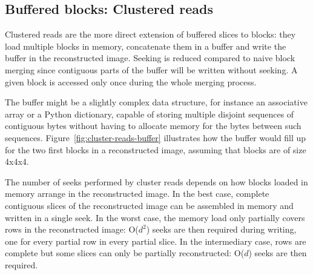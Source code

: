 \documentclass[10pt, conference, compsocconf]{IEEEtran}
\begin{document}
\subsection{Buffered blocks: Clustered reads}

Clustered reads are the more direct extension of buffered slices to
blocks: they load multiple blocks in memory, concatenate them in a
buffer and write the buffer in the reconstructed image. Seeking is
reduced compared to naive block merging since contiguous parts of the
buffer will be written without seeking. A given
block is accessed only once during the whole merging process.

The buffer might be a slightly complex data structure, for instance an
associative array or a Python dictionary, capable of storing multiple
disjoint sequences of contiguous bytes without having to allocate
memory for the bytes between such
sequences. Figure~\ref{fig:cluster-reads-buffer} illustrates how the
buffer would fill up for the two first blocks in a reconstructed
image, assuming that blocks are of size 4x4x4.

The number of seeks performed by cluster reads depends on how blocks
loaded in memory arrange in the reconstructed image. In the best case,
complete contiguous slices of the reconstructed image can be assembled
in memory and written in a single seek. In the worst case, the
memory load only partially covers rows in the reconstructed image:
O($d^2$) seeks are then required during writing, one for every partial
row in every partial slice. In the intermediary case, rows are
complete but some slices can only be partially reconstructed: O($d$)
seeks are then required.
\end{document}
